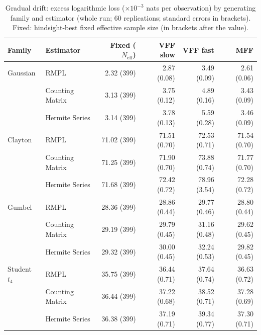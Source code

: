 \begin{table}[htbp]
\centering
\small
\caption{Gradual drift: excess logarithmic loss ($\times10^{-3}$ nats per observation) by generating family and estimator (whole run; 60 replications; standard errors in brackets). Fixed: hindsight-best fixed effective sample size (in brackets after the value).}
\label{tab:app-strategy-excess-drift}
\begin{tabular}{llrrrr}
\toprule
Family & Estimator & Fixed ($N_{\mathrm{eff}}$) & VFF slow & VFF fast & MFF \\
\midrule
Gaussian & RMPL & 2.32 (399) & 2.87 (0.08) & 3.49 (0.09) & 2.61 (0.06) \\
 & Counting Matrix & 3.13 (399) & 3.75 (0.12) & 4.89 (0.16) & 3.43 (0.09) \\
 & Hermite Series & 3.14 (399) & 3.78 (0.13) & 5.59 (0.28) & 3.46 (0.09) \\
\addlinespace
Clayton & RMPL & 71.02 (399) & 71.51 (0.70) & 72.53 (0.71) & 71.54 (0.70) \\
 & Counting Matrix & 71.25 (399) & 71.90 (0.70) & 73.88 (0.74) & 71.77 (0.70) \\
 & Hermite Series & 71.68 (399) & 72.42 (0.72) & 78.96 (3.54) & 72.28 (0.72) \\
\addlinespace
Gumbel & RMPL & 28.36 (399) & 28.86 (0.44) & 29.77 (0.46) & 28.80 (0.44) \\
 & Counting Matrix & 29.19 (399) & 29.79 (0.45) & 31.16 (0.48) & 29.62 (0.45) \\
 & Hermite Series & 29.32 (399) & 30.00 (0.45) & 32.24 (0.53) & 29.82 (0.45) \\
\addlinespace
Student $t_4$ & RMPL & 35.75 (399) & 36.44 (0.71) & 37.64 (0.74) & 36.63 (0.72) \\
 & Counting Matrix & 36.44 (399) & 37.22 (0.68) & 38.52 (0.71) & 37.28 (0.69) \\
 & Hermite Series & 36.38 (399) & 37.19 (0.71) & 39.34 (0.77) & 37.30 (0.71) \\
\bottomrule
\end{tabular}
\end{table}

